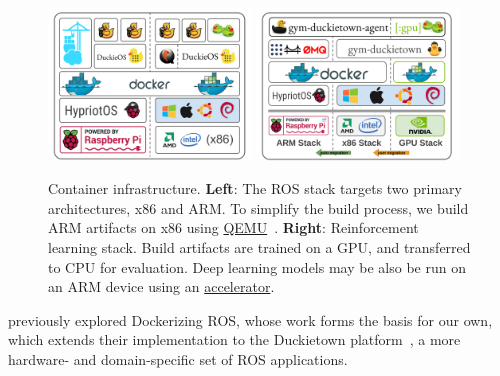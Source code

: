\documentclass[12pt,initial,twoside,maitrise]{dms}
\numberwithin{equation}{section}
\numberwithin{table}{chapter}
\numberwithin{figure}{chapter}
\begin{document}
\begin{figure}[ht]
    \centering
    \includegraphics[width=0.48\textwidth]{../figures/docker_stack_1.png}
    \includegraphics[width=0.48\textwidth]{../figures/docker_stack_2.png}
    \caption{Container infrastructure. \textbf{Left}: The ROS stack targets two primary architectures, x86 and ARM. To simplify the build process, we build ARM artifacts on x86 using \href{https://www.qemu.org}{QEMU}~\citep{bellard2005qemu}. \textbf{Right}: Reinforcement learning stack. Build artifacts are trained on a GPU, and transferred to CPU for evaluation. Deep learning models may be also be run on an ARM device using an \href{https://software.intel.com/en-us/neural-compute-stick}{accelerator}.}
    \label{fig:docker}
\end{figure}

\citet{white2017ros-docker} previously explored Dockerizing ROS, whose work forms the basis for our own, which extends their implementation to the Duckietown platform~\citep{paull2017duckietown}, a more hardware- and domain-specific set of ROS applications.
\end{document}
